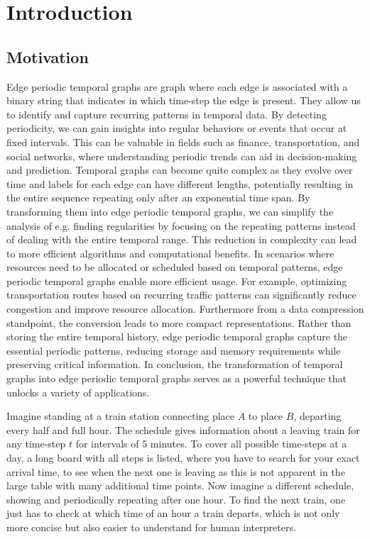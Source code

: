 \chapter{Introduction}
\label{ch:Introduction}
\section{Motivation}
\label{ch:Introduction:sec:Motivation}
Edge periodic temporal graphs are graph where each edge is associated with a binary string that indicates in which time-step the edge is present. They allow us to identify and capture recurring patterns in temporal data. By detecting periodicity, we can gain insights into regular behaviors or events that occur at fixed intervals. This can be valuable in fields such as finance, transportation, and social networks, where understanding periodic trends can aid in decision-making and prediction. Temporal graphs can become quite complex as they evolve over time and labels for each edge can have different lengths, potentially resulting in the entire sequence repeating only after an exponential time span. By transforming them into edge periodic temporal graphs, we can simplify the analysis of e.g. finding regularities by focusing on the repeating patterns instead of dealing with the entire temporal range. This reduction in complexity can lead to more efficient algorithms and computational benefits. In scenarios where resources need to be allocated or scheduled based on temporal patterns, edge periodic temporal graphs enable more efficient usage. For example, optimizing transportation routes based on recurring traffic patterns can significantly reduce congestion and improve resource allocation. Furthermore from a data compression standpoint, the conversion leads to more compact representations. Rather than storing the entire temporal history, edge periodic temporal graphs capture the essential periodic patterns, reducing storage and memory requirements while preserving critical information. In conclusion, the transformation of temporal graphs into edge periodic temporal graphs serves as a powerful technique that unlocks a variety of applications.

Imagine standing at a train station connecting place $A$ to place $B$, departing every half and full hour. The schedule gives information about a leaving train for any time-step $t$ for intervals of 5 minutes. To cover all possible time-steps at a day, a long board with all steps is listed, where you have to search for your exact arrival time, to see when the next one is leaving as this is not apparent in the large table with many additional time points. Now imagine a different schedule, showing and periodically repeating after one hour. To find the next train, one just has to check at which time of an hour a train departs, which is not only more concise but also easier to understand for human interpreters.
